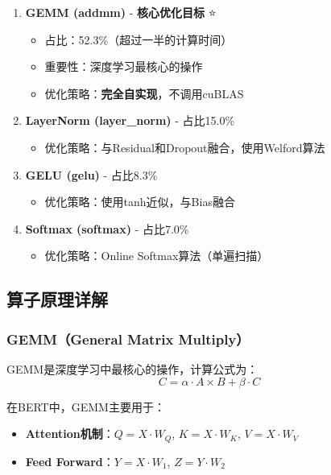 \documentclass[12pt,a4paper]{article}
\begin{document}
\begin{enumerate}
    \item \textbf{GEMM (addmm)} - \textbf{核心优化目标} ⭐
    \begin{itemize}
        \item 占比：52.3\%（超过一半的计算时间）
        \item 重要性：深度学习最核心的操作
        \item 优化策略：\textbf{完全自实现}，不调用cuBLAS
    \end{itemize}
    
    \item \textbf{LayerNorm (layer\_norm)} - 占比15.0\%
    \begin{itemize}
        \item 优化策略：与Residual和Dropout融合，使用Welford算法
    \end{itemize}
    
    \item \textbf{GELU (gelu)} - 占比8.3\%
    \begin{itemize}
        \item 优化策略：使用tanh近似，与Bias融合
    \end{itemize}
    
    \item \textbf{Softmax (softmax)} - 占比7.0\%
    \begin{itemize}
        \item 优化策略：Online Softmax算法（单遍扫描）
    \end{itemize}
\end{enumerate}

\subsection{算子原理详解}

\subsubsection{GEMM（General Matrix Multiply）}

GEMM是深度学习中最核心的操作，计算公式为：
\begin{equation}
    C = \alpha \cdot A \times B + \beta \cdot C
\end{equation}

在BERT中，GEMM主要用于：
\begin{itemize}
    \item \textbf{Attention机制}：$Q = X \cdot W_Q$, $K = X \cdot W_K$, $V = X \cdot W_V$
    \item \textbf{Feed Forward}：$Y = X \cdot W_1$, $Z = Y \cdot W_2$
\end{itemize}
\end{document}

